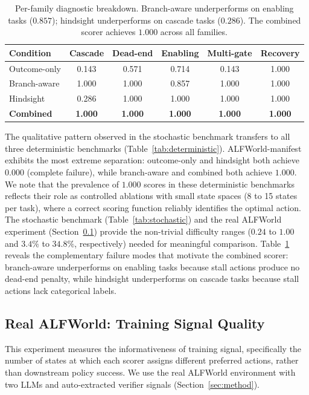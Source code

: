 \documentclass[11pt]{article}
\begin{document}
\begin{table}[t]
\centering
\caption{Per-family diagnostic breakdown. Branch-aware underperforms on enabling tasks ($0.857$); hindsight underperforms on cascade tasks ($0.286$). The combined scorer achieves $1.000$ across all families.}
\label{tab:perfamily}
\begin{tabular}{lccccc}
\toprule
Condition & Cascade & Dead-end & Enabling & Multi-gate & Recovery \\
\midrule
Outcome-only & 0.143 & 0.571 & 0.714 & 0.143 & 1.000 \\
Branch-aware & 1.000 & 1.000 & 0.857 & 1.000 & 1.000 \\
Hindsight & 0.286 & 1.000 & 1.000 & 1.000 & 1.000 \\
\textbf{Combined} & \textbf{1.000} & \textbf{1.000} & \textbf{1.000} & \textbf{1.000} & \textbf{1.000} \\
\bottomrule
\end{tabular}
\end{table}

The qualitative pattern observed in the stochastic benchmark transfers to all three deterministic benchmarks (Table~\ref{tab:deterministic}). ALFWorld-manifest exhibits the most extreme separation: outcome-only and hindsight both achieve $0.000$ (complete failure), while branch-aware and combined both achieve $1.000$. We note that the prevalence of $1.000$ scores in these deterministic benchmarks reflects their role as controlled ablations with small state spaces (8 to 15 states per task), where a correct scoring function reliably identifies the optimal action. The stochastic benchmark (Table~\ref{tab:stochastic}) and the real ALFWorld experiment (Section~\ref{sec:alfworld}) provide the non-trivial difficulty ranges ($0.24$ to $1.00$ and $3.4\%$ to $34.8\%$, respectively) needed for meaningful comparison. Table~\ref{tab:perfamily} reveals the complementary failure modes that motivate the combined scorer: branch-aware underperforms on enabling tasks because stall actions produce no dead-end penalty, while hindsight underperforms on cascade tasks because stall actions lack categorical labels.

\subsection{Real ALFWorld: Training Signal Quality}
\label{sec:alfworld}

This experiment measures the informativeness of training signal, specifically the number of states at which each scorer assigns different preferred actions, rather than downstream policy success. We use the real ALFWorld environment \citep{shridhar2021alfworld} with two LLMs and auto-extracted verifier signals (Section~\ref{sec:method}).
\end{document}
